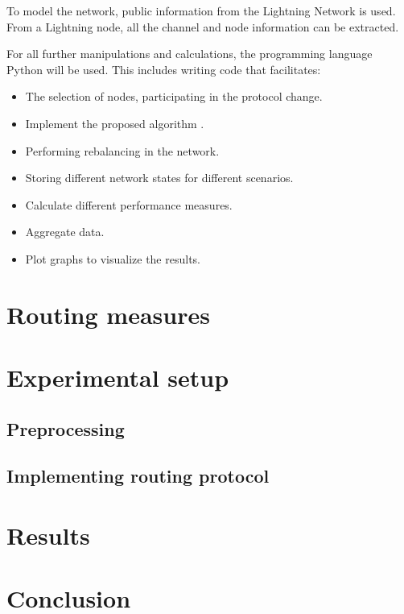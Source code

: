 \documentclass[draft]{fhnwreport}       %
\begin{document}
To model the network, public information from the Lightning Network is used. From a Lightning node, all the channel and node information can be extracted.

For all further manipulations and calculations, the programming language Python will be used. This includes writing code that facilitates: 
\begin{itemize}
  \item The selection of nodes, participating in the protocol change.
  \item Implement the proposed algorithm \cite[p.~3]{pickhardt_imbalance_2019}.
  \item Performing rebalancing in the network.
  \item Storing different network states for different scenarios.
  \item Calculate different performance measures.
  \item Aggregate data.
  \item Plot graphs to visualize the results.
\end{itemize}

\section{Routing measures}
\section{Experimental setup}

\subsection{Preprocessing}

\subsection{Implementing routing protocol}
\section{Results}
\section{Conclusion}
\end{document}
